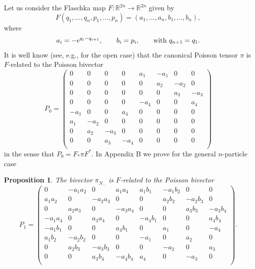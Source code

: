 \documentclass[12pt]{article}
\newtheorem{prop}[theorem]{Proposition}
\newcommand{\RR}{{{\mathbb{R}}}}
\begin{document}
Let us consider the Flaschka map
$F:\RR^{2n}\to \RR^{2n}$ given by $$F(q_1,\dots,q_n,p_1,\dots,p_n)=(a_1,\dots,a_n,b_1,\dots,b_n),$$ where
\begin{equation}
\label{Flaschka-map}
a_i=-{\rm e}^{q_i-q_{i+1}},\qquad b_i=p_i,\qquad\mbox{with $q_{n+1}=q_1$.}
\end{equation}
It is well know (see, e.g., \cite{Nunes-Marle} for the open case) that the canonical Poisson tensor $\pi$ is $F$-related 
to the Poisson bivector 
$$
P_0=\left(
\begin{array}{cccc|cccc}
 0 & 0 & 0 & 0 & a_1 & -a_1 & 0 & 0 \\
 0 & 0 & 0 & 0 & 0 & a_2 & -a_2 & 0 \\
 0 & 0 & 0 & 0 & 0 & 0 & a_3 & -a_3 \\
 0 & 0 & 0 & 0 & -a_4 & 0 & 0 & a_4 \\
 \hline
 -a_1 & 0 & 0 & a_4 & 0 & 0 & 0 & 0 \\
 a_1 & -a_2 & 0 & 0 & 0 & 0 & 0 & 0 \\
 0 & a_2 & -a_3 & 0 & 0 & 0 & 0 & 0 \\
 0 & 0 & a_3 & -a_4 & 0 & 0 & 0 & 0 \\
\end{array}
\right)
$$
in the sense that $P_0%
=F_*\pi%
F^*$. In Appendix B we prove for the general $n$-particle case
\begin{prop}
\label{prop:F-rel}
The bivector $\pi_{N_-}^{\phantom{\sharp}}$ is $F$-related to the Poisson bivector 
\begin{equation}
\label{P1-Toda}
P_1=\left(
\begin{array}{cccc|cccc}
 0 & -a_1 a_2 & 0 & a_1 a_4 & a_1 b_1
   & -a_1 b_2 & 0 & 0 \\
 a_1 a_2 & 0 & -a_2 a_3 & 0 & 0 & a_2
   b_2 & -a_2 b_3 & 0 \\
 0 & a_2 a_3 & 0 & -a_3 a_4 & 0 & 0 &
   a_3 b_3 & -a_3 b_4 \\
 -a_1 a_4 & 0 & a_3 a_4 & 0 & -a_4 b_1
   & 0 & 0 & a_4 b_4 \\
   \hline
 -a_1 b_1 & 0 & 0 & a_4 b_1 & 0 & a_1
   & 0 & -a_4 \\
 a_1 b_2 & -a_2 b_2 & 0 & 0 & -a_1 & 0
   & a_2 & 0 \\
 0 & a_2 b_3 & -a_3 b_3 & 0 & 0 & -a_2
   & 0 & a_3 \\
 0 & 0 & a_3 b_4 & -a_4 b_4 & a_4 & 0
   & -a_3 & 0 \\
\end{array}
\right).
\end{equation}
\end{prop}
\end{document}
